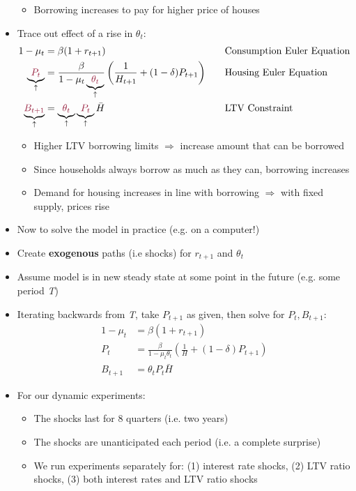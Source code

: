 \documentclass[a4paper,twoside]{article}
\numberwithin{equation}{section}
\numberwithin{figure}{section}
\begin{document}
\begin{itemize}
\begin{itemize}
			\item Borrowing increases to pay for higher price of houses
		\end{itemize}
		\item Trace out effect of a rise in \textcolor{myred}{\( \theta_t \)}:
		\begin{alignat*}{2}
			1-\mu_t&=\beta(1+r_{t+1}) &&\text{Consumption Euler Equation}\\
			\underbrace{\textcolor{myred}{P_t}}_\uparrow&=\frac{\beta}{1-\mu_t\underbrace{\textcolor{myred}{\theta_t}}_\uparrow}\left( \frac{1}{H_{t+1}} + (1-\delta)P_{t+1} \right)\quad &&\text{Housing Euler Equation}\\
			\underbrace{\textcolor{myred}{B_{t+1}}}_\uparrow&=\underbrace{\textcolor{myred}{\theta_t}}_\uparrow\underbrace{\textcolor{myred}{P_t}}_\uparrow\bar{H} &&\text{LTV Constraint} 
		\end{alignat*}
		\begin{itemize}
			\item Higher LTV borrowing limits \( \Rightarrow \) increase amount that can be borrowed
			\item Since households always borrow as much as they can, borrowing increases
			\item Demand for housing increases in line with borrowing \( \Rightarrow \) with fixed supply, prices rise
		\end{itemize}
		\item Now to solve the model in practice (e.g. on a computer!)
		\item Create \textbf{exogenous} paths (i.e shocks) for \( r_{t+1} \) and \( \theta_t \)
		\item Assume model is in new steady state at some point in the future (e.g. some period \textit{T})
		\item Iterating backwards from \textit{T}, take \( P_{t+1} \) as given, then solve for \( P_t,B_{t+1} \):
		\begin{align*}
			1- \mu_t &= \beta(1+r_{t+1}) \\
			P_t &= \frac{\beta}{1-\mu_t\theta_t}\left( \frac{1}{H} + (1-\delta)P_{t+1} \right)\\
			B_{t+1} &= \theta_tP_t\bar{H}
		\end{align*}
		\item For our dynamic experiments:
		\begin{itemize}
			\item The shocks last for 8 quarters (i.e. two years)
			\item The shocks are unanticipated each period (i.e. a complete surprise)
			\item We run experiments separately for: (1) interest rate shocks, (2) LTV ratio shocks, (3) both interest rates and LTV ratio shocks
		\end{itemize}
	\end{itemize}
\end{document}
